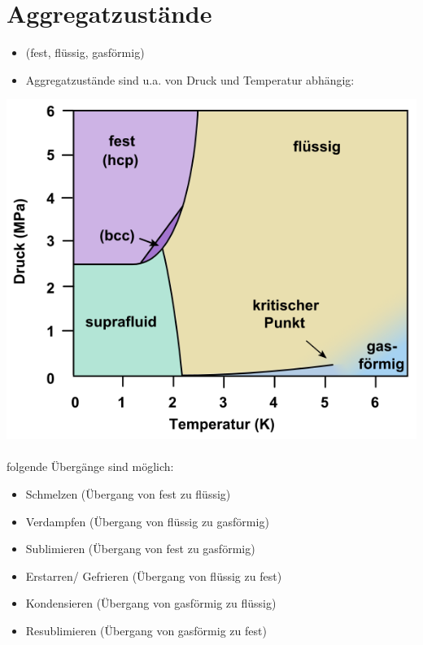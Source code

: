 \documentclass[10pt,a4paper]{article}
\author{Erik Zimmermann}
\begin{document}
\section{Aggregatzustände}
\begin{itemize}
\item (fest, flüssig, gasförmig)
\item Aggregatzustände sind u.a. von Druck und Temperatur abhängig:
\end{itemize}
\includegraphics[scale=0.4]{579px-He4_de.png} \\\\
folgende Übergänge sind möglich:
\begin{itemize}
\item    Schmelzen (Übergang von fest zu flüssig)
\item    Verdampfen (Übergang von flüssig zu gasförmig)
\item    Sublimieren (Übergang von fest zu gasförmig)
\item    Erstarren/ Gefrieren (Übergang von flüssig zu fest)
\item    Kondensieren (Übergang von gasförmig zu flüssig)
\item    Resublimieren (Übergang von gasförmig zu fest)
\end{itemize}
\newpage
\end{document}

